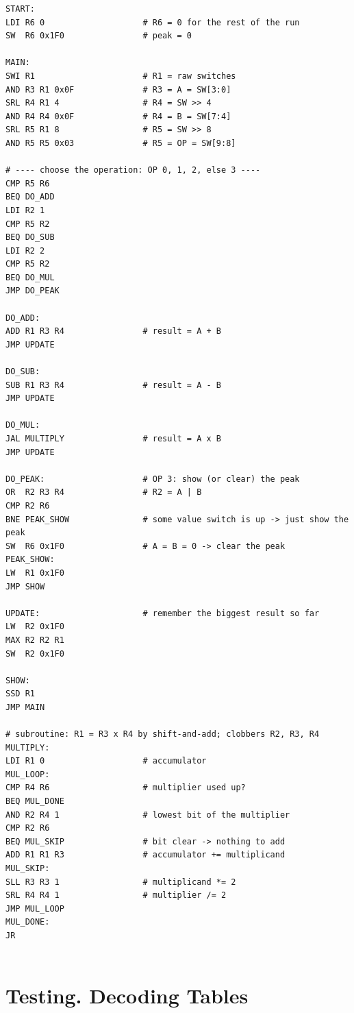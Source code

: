 \documentclass{article}
\begin{document}
\begin{verbatim}
START:
LDI R6 0                    # R6 = 0 for the rest of the run
SW  R6 0x1F0                # peak = 0

MAIN:
SWI R1                      # R1 = raw switches
AND R3 R1 0x0F              # R3 = A = SW[3:0]
SRL R4 R1 4                 # R4 = SW >> 4
AND R4 R4 0x0F              # R4 = B = SW[7:4]
SRL R5 R1 8                 # R5 = SW >> 8
AND R5 R5 0x03              # R5 = OP = SW[9:8]

# ---- choose the operation: OP 0, 1, 2, else 3 ----
CMP R5 R6
BEQ DO_ADD
LDI R2 1
CMP R5 R2
BEQ DO_SUB
LDI R2 2
CMP R5 R2
BEQ DO_MUL
JMP DO_PEAK

DO_ADD:
ADD R1 R3 R4                # result = A + B
JMP UPDATE

DO_SUB:
SUB R1 R3 R4                # result = A - B
JMP UPDATE

DO_MUL:
JAL MULTIPLY                # result = A x B
JMP UPDATE

DO_PEAK:                    # OP 3: show (or clear) the peak
OR  R2 R3 R4                # R2 = A | B
CMP R2 R6
BNE PEAK_SHOW               # some value switch is up -> just show the peak
SW  R6 0x1F0                # A = B = 0 -> clear the peak
PEAK_SHOW:
LW  R1 0x1F0
JMP SHOW

UPDATE:                     # remember the biggest result so far
LW  R2 0x1F0
MAX R2 R2 R1
SW  R2 0x1F0

SHOW:
SSD R1
JMP MAIN

# subroutine: R1 = R3 x R4 by shift-and-add; clobbers R2, R3, R4
MULTIPLY:
LDI R1 0                    # accumulator
MUL_LOOP:
CMP R4 R6                   # multiplier used up?
BEQ MUL_DONE
AND R2 R4 1                 # lowest bit of the multiplier
CMP R2 R6
BEQ MUL_SKIP                # bit clear -> nothing to add
ADD R1 R1 R3                # accumulator += multiplicand
MUL_SKIP:
SLL R3 R3 1                 # multiplicand *= 2
SRL R4 R4 1                 # multiplier /= 2
JMP MUL_LOOP
MUL_DONE:
JR


\end{verbatim}

\section{Testing. Decoding Tables}
\end{document}
